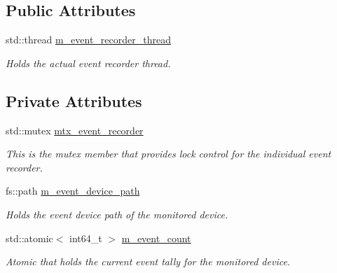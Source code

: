 \subsection*{Public Attributes}
\begin{DoxyCompactItemize}
\item 
\mbox{\label{classEventDetect_1_1InputEventRecorders_1_1EventRecorder_ad61ec8b2d9652351e8fa9dde2de5bc78}} 
std\+::thread \mbox{\hyperlink{classEventDetect_1_1InputEventRecorders_1_1EventRecorder_ad61ec8b2d9652351e8fa9dde2de5bc78}{m\+\_\+event\+\_\+recorder\+\_\+thread}}
\begin{DoxyCompactList}\small\item\em Holds the actual event recorder thread. \end{DoxyCompactList}\end{DoxyCompactItemize}
\subsection*{Private Attributes}
\begin{DoxyCompactItemize}
\item 
\mbox{\label{classEventDetect_1_1InputEventRecorders_1_1EventRecorder_a269b65d9d57144f449ea519a3c0ea283}} 
std\+::mutex \mbox{\hyperlink{classEventDetect_1_1InputEventRecorders_1_1EventRecorder_a269b65d9d57144f449ea519a3c0ea283}{mtx\+\_\+event\+\_\+recorder}}
\begin{DoxyCompactList}\small\item\em This is the mutex member that provides lock control for the individual event recorder. \end{DoxyCompactList}\item 
\mbox{\label{classEventDetect_1_1InputEventRecorders_1_1EventRecorder_a7d18cfebc07b50c215e6369d084b9740}} 
fs\+::path \mbox{\hyperlink{classEventDetect_1_1InputEventRecorders_1_1EventRecorder_a7d18cfebc07b50c215e6369d084b9740}{m\+\_\+event\+\_\+device\+\_\+path}}
\begin{DoxyCompactList}\small\item\em Holds the event device path of the monitored device. \end{DoxyCompactList}\item 
\mbox{\label{classEventDetect_1_1InputEventRecorders_1_1EventRecorder_a638aa037004cb9d79b97f89675714a95}} 
std\+::atomic$<$ int64\+\_\+t $>$ \mbox{\hyperlink{classEventDetect_1_1InputEventRecorders_1_1EventRecorder_a638aa037004cb9d79b97f89675714a95}{m\+\_\+event\+\_\+count}}
\begin{DoxyCompactList}\small\item\em Atomic that holds the current event tally for the monitored device. \end{DoxyCompactList}\end{DoxyCompactItemize}


